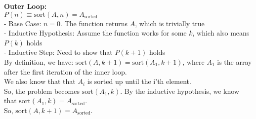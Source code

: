 \documentclass[a4paper]{article}
\begin{document}
\begin{enumerate}
\begin{enumerate}
        \textbf{Outer Loop:} \\
        $P(n) \equiv \text{sort}(A, n) = A_{\text{sorted}}$ \\
        
        - Base Case: $n = 0$. The function returns $A$, which is trivially true \\
        - Inductive Hypothesis: Assume the function works for some $k$, which also means $P(k)$ holds \\
        - Inductive Step: Need to show that $P(k + 1)$ holds \\

        By definition, we have: $\text{sort}(A, k + 1) = \text{sort}(A_1, k + 1)$, where $A_1$ is the array after the first iteration of the inner loop. \\
        We also know that that $A_i$ is sorted up until the i'th element. \\
        So, the problem becomes $\text{sort}(A_1, k)$. By the inductive hypothesis, we know that $\text{sort}(A_1, k) = A_{\text{sorted}}$. \\
        So, $\text{sort}(A, k + 1) = A_{\text{sorted}}$. \\
    \end{enumerate}

    \end{enumerate}


\newpage
\end{document}
